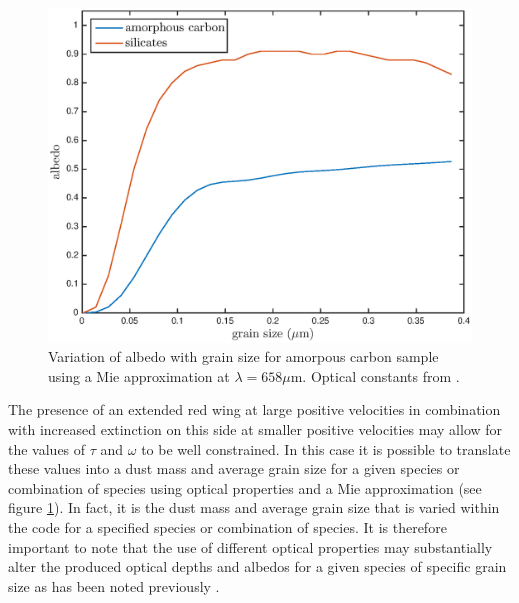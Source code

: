 \documentclass[useAMS,usenatbib,usegraphicx]{mnras}
\begin{document}
\begin{figure}
\begin{center}
\includegraphics[trim =37 10 45 15,clip=true,scale=0.51]{grainsize_albedo}
\caption{Variation of albedo with grain size for amorpous carbon sample using a Mie approximation at $\lambda = 658 \mu $m. Optical constants from \citet{Zubko1996}.}
\label{albedo_grain}
\end{center}
\end{figure}

The presence of an extended red wing at large positive velocities in combination with increased extinction on this side at smaller positive velocities may allow for the values of $\tau$ and $\omega$ to be well constrained.  In this case it is possible to translate these values into a dust mass and average grain size for a given species or combination of species using optical properties and a Mie approximation (see figure \ref{albedo_grain}).  In fact, it is the dust mass and average grain size that is varied within the code for a specified species or combination of species.  It is therefore important to note that the use of different optical properties may substantially alter the produced optical depths and albedos for a given species of specific grain size as has been noted previously \citep{Owen2015}.
\end{document}
